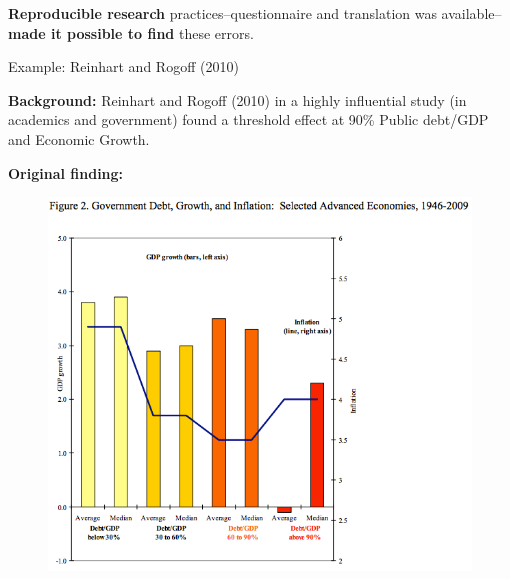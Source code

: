 \documentclass[10pt]{beamer}
\begin{document}
\begin{frame}

    \begin{center}
        \textbf{Reproducible research} practices--questionnaire and translation was available--\textbf{made it possible to find} these errors.
    \end{center}

\end{frame}

\begin{frame}{Example: Reinhart and Rogoff (2010)}

    \textbf{Background:} Reinhart and Rogoff (2010) in a highly influential study (in academics and government) found a threshold effect at 90\% Public debt/GDP and Economic Growth.

    \textbf{Original finding:}

    \begin{figure}
        \includegraphics[scale=0.3]{img/rr_original.png}
    \end{figure}


\end{frame}
\end{document}

